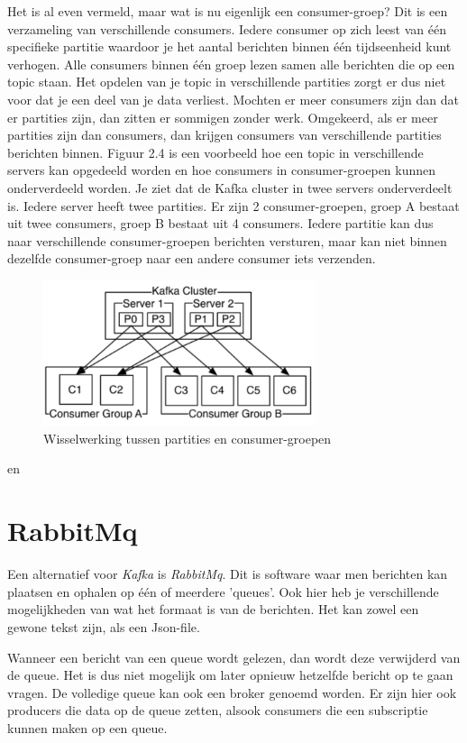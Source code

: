 Het is al even vermeld, maar wat is nu eigenlijk een consumer-groep? Dit is een verzameling van verschillende consumers. Iedere consumer op zich leest van één specifieke partitie waardoor je het aantal berichten binnen één tijdseenheid kunt verhogen. Alle consumers binnen één groep lezen samen alle berichten die op een topic staan. Het opdelen van je topic in verschillende partities zorgt er dus niet voor dat je een deel van je data verliest. Mochten er meer consumers zijn dan dat er partities zijn, dan zitten er sommigen zonder werk. Omgekeerd, als er meer partities zijn dan consumers, dan krijgen consumers van verschillende partities berichten binnen.  Figuur 2.4 is een voorbeeld hoe een topic in verschillende servers kan opgedeeld worden en hoe consumers in consumer-groepen kunnen onderverdeeld worden. Je ziet dat de Kafka cluster in twee servers onderverdeelt is. Iedere server heeft twee partities. Er zijn 2 consumer-groepen, groep A bestaat uit twee consumers, groep B bestaat uit 4 consumers. Iedere partitie kan dus naar verschillende consumer-groepen berichten versturen, maar kan niet binnen dezelfde consumer-groep naar een andere consumer iets verzenden. 

 \begin{figure}[h!]
    \centering
    \includegraphics[width=80mm]{../kafkaConsumers.png}
    \caption{Wisselwerking tussen partities en consumer-groepen}
    
\end{figure}

\autocite{Sookocheff2015} en \autocite{Johansson2016}

\section{RabbitMq}

Een alternatief voor \emph{Kafka} is \emph{RabbitMq}. Dit is software waar men berichten kan plaatsen en ophalen op één of meerdere 'queues'. Ook hier heb je verschillende mogelijkheden van wat het formaat is van de berichten. Het kan zowel een gewone tekst zijn, als een Json-file. 

Wanneer een bericht van een queue wordt gelezen, dan wordt deze verwijderd van de queue. Het is dus niet mogelijk om later opnieuw hetzelfde bericht op te gaan vragen. De volledige queue kan ook een broker genoemd worden. Er zijn hier ook producers die data op de queue zetten, alsook consumers die een subscriptie kunnen maken op een queue. 



